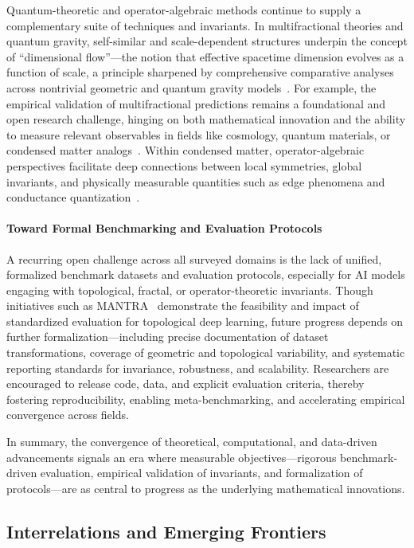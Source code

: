 \documentclass[sigconf]{acmart}
\begin{document}
Quantum-theoretic and operator-algebraic methods continue to supply a complementary suite of techniques and invariants. In multifractional theories and quantum gravity, self-similar and scale-dependent structures underpin the concept of ``dimensional flow''—the notion that effective spacetime dimension evolves as a function of scale, a principle sharpened by comprehensive comparative analyses across nontrivial geometric and quantum gravity models~\cite{ref5,ref7,ref20}. For example, the empirical validation of multifractional predictions remains a foundational and open research challenge, hinging on both mathematical innovation and the ability to measure relevant observables in fields like cosmology, quantum materials, or condensed matter analogs~\cite{ref5,ref24,ref25}. Within condensed matter, operator-algebraic perspectives facilitate deep connections between local symmetries, global invariants, and physically measurable quantities such as edge phenomena and conductance quantization~\cite{ref56,ref57,ref58}. 

\paragraph{Toward Formal Benchmarking and Evaluation Protocols}
A recurring open challenge across all surveyed domains is the lack of unified, formalized benchmark datasets and evaluation protocols, especially for AI models engaging with topological, fractal, or operator-theoretic invariants. Though initiatives such as MANTRA~\cite{ref26} demonstrate the feasibility and impact of standardized evaluation for topological deep learning, future progress depends on further formalization—including precise documentation of dataset transformations, coverage of geometric and topological variability, and systematic reporting standards for invariance, robustness, and scalability. Researchers are encouraged to release code, data, and explicit evaluation criteria, thereby fostering reproducibility, enabling meta-benchmarking, and accelerating empirical convergence across fields. 

In summary, the convergence of theoretical, computational, and data-driven advancements signals an era where measurable objectives—rigorous benchmark-driven evaluation, empirical validation of invariants, and formalization of protocols—are as central to progress as the underlying mathematical innovations.

\subsection{Interrelations and Emerging Frontiers}
\end{document}
